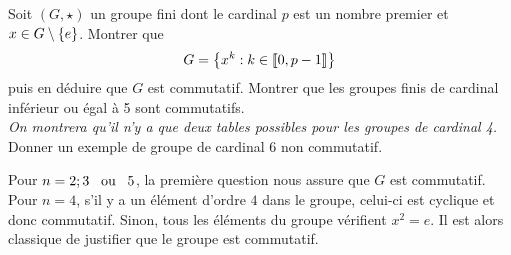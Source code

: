 \documentclass{magnolia}
\begin{document}
\begin{questions}
\question Soit $(G,\star)$ un groupe fini dont le cardinal $p$ est un nombre
  premier et $x\in G\setminus\left\{e\right\}$. Montrer que
  \[G=\left\{x^k : k\in\left\llbracket 0,p-1\right\rrbracket\right\}\]
  puis en déduire que $G$ est commutatif.
\question Montrer que les groupes finis de cardinal inférieur ou égal à 5 sont
  commutatifs.\\
  \textit{On montrera qu'il n'y a que deux tables possibles pour les groupes
  de cardinal 4.}
\question Donner un exemple de groupe de cardinal 6 non commutatif.
\end{questions}

\begin{sol}
\begin{questions}
\question 
\question Pour $n = 2; 3 \quad\!\text{ou}\quad\! 5$, la première question nous assure que $G$ est commutatif.
Pour $n = 4$, s'il y a un élément d'ordre $4$ dans le groupe, celui-ci est cyclique et donc commutatif. Sinon, tous les éléments du groupe vérifient $x^2 = e$. Il est alors classique de
justifier que le groupe est commutatif.
\question 
\end{questions}
\end{sol}

\end{document}
